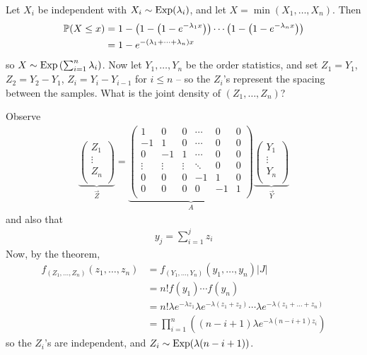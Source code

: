 \documentclass{../../template/note}
\begin{document}
    \begin{example*}
        Let \(X_i\) be independent with \(X_i \sim \operatorname{Exp}(\lambda_i)\), and let \(X = \min(X_1, \dots, X_n)\). Then
        \begin{align*}
            \mathbb P(X \leq x) &= 1 - \left(1-\left(1-e^{-\lambda_1x}\right)\right)\cdots\left(1-\left(1-e^{-\lambda_nx}\right)\right) \\
            &= 1 - e^{-(\lambda_1 + \dots + \lambda_n)x}
        \end{align*}
        so \(X \sim \operatorname{Exp}\left(\sum_{i=1}^n \lambda_i\right)\). Now let \(Y_1, \dots, Y_n\) be the order statistics, and set \(Z_1 = Y_1\), \(Z_2 = Y_2 - Y_1\), \(Z_i = Y_i - Y_{i-1}\) for \(i \leq n\) -- so the \(Z_i\)'s represent the spacing between the samples. What is the joint density of \((Z_1, \dots, Z_n)\)?

        Observe
        \begin{align*}
            \underbrace{\begin{pmatrix}
             Z_1 \\
             \vdots \\
             Z_n \\
            \end{pmatrix}}_{\vec Z} = \underbrace{\begin{pmatrix}
             1 & 0 & 0 & \cdots & 0 & 0 \\
             -1 & 1 & 0 & \cdots & 0 & 0 \\
             0 & -1 & 1 & \cdots & 0 & 0 \\
             \vdots & \vdots & \vdots & \ddots & 0 & 0 \\
             0 & 0 & 0 & -1 & 1 & 0 \\
             0 & 0 & 0 & 0 & -1 & 1 \\
            \end{pmatrix}}_A \underbrace{\begin{pmatrix}
             Y_1 \\
             \vdots \\
             Y_n \\
            \end{pmatrix}}_{\vec Y}
        \end{align*}
        and also that
        \begin{align*}
            y_j = \sum_{i=1}^j z_i
        \end{align*}
        Now, by the theorem,
        \begin{align*}
            f_{(Z_1, \dots, Z_n)}(z_1, \dots, z_n) &= f_{(Y_1, \dots, Y_n)}(y_1, \dots, y_n)|J| \\
            &= n!f(y_1) \cdots f(y_n) \\
            &= n!\lambda e^{-\lambda z_1}\lambda e^{-\lambda(z_1+z_2)} \cdots \lambda e^{-\lambda(z_1+\dots+z_n)} \\
            &= \prod_{i=1}^n \left((n-i+1)\lambda e^{-\lambda(n-i+1)z_i}\right)
        \end{align*}
        so the \(Z_i\)'s are independent, and \(Z_i \sim \operatorname{Exp}(\lambda(n-i+1))\).
    \end{example*}
        
\end{document}
